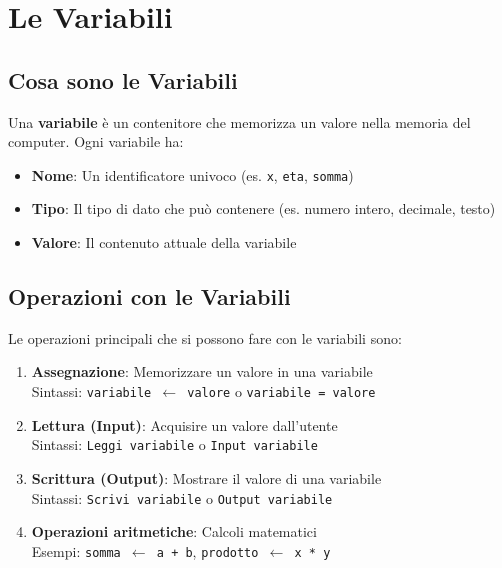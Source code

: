 \documentclass[a4paper,16pt]{article}
\begin{document}
\newpage
\section{Le Variabili}

\subsection{Cosa sono le Variabili}

Una \textbf{variabile} è un contenitore che memorizza un valore nella memoria del computer. Ogni variabile ha:

\begin{itemize}[leftmargin=*]
    \item \textbf{Nome}: Un identificatore univoco (es. \texttt{x}, \texttt{eta}, \texttt{somma})
    \item \textbf{Tipo}: Il tipo di dato che può contenere (es. numero intero, decimale, testo)
    \item \textbf{Valore}: Il contenuto attuale della variabile
\end{itemize}

\subsection{Operazioni con le Variabili}

Le operazioni principali che si possono fare con le variabili sono:

\begin{enumerate}[leftmargin=*]
    \item \textbf{Assegnazione}: Memorizzare un valore in una variabile\\
    Sintassi: \texttt{variabile $\leftarrow$ valore} o \texttt{variabile = valore}
    
    \item \textbf{Lettura (Input)}: Acquisire un valore dall'utente\\
    Sintassi: \texttt{Leggi variabile} o \texttt{Input variabile}
    
    \item \textbf{Scrittura (Output)}: Mostrare il valore di una variabile\\
    Sintassi: \texttt{Scrivi variabile} o \texttt{Output variabile}
    
    \item \textbf{Operazioni aritmetiche}: Calcoli matematici\\
    Esempi: \texttt{somma $\leftarrow$ a + b}, \texttt{prodotto $\leftarrow$ x * y}
\end{enumerate}
\end{document}

